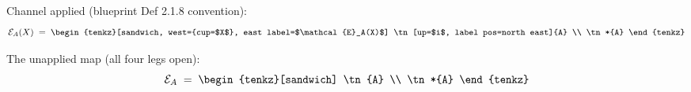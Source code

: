 \documentclass[varwidth=16cm, border=6pt]{standalone}
\begin{document}
Channel applied (blueprint Def 2.1.8 convention):
\[
  \mathcal{E}_A(X) \;=\;
  \begin{tenkz}[sandwich, west={cup=$X$}, east label=$\mathcal{E}_A(X)$]
    \tn[up=$i$, label pos=north east]{A} \\
    \tn*{A}
  \end{tenkz}
\]

The unapplied map (all four legs open):
\[
  \mathcal{E}_A \;=\;
  \begin{tenkz}[sandwich]
    \tn{A} \\
    \tn*{A}
  \end{tenkz}
\]
\end{document}
